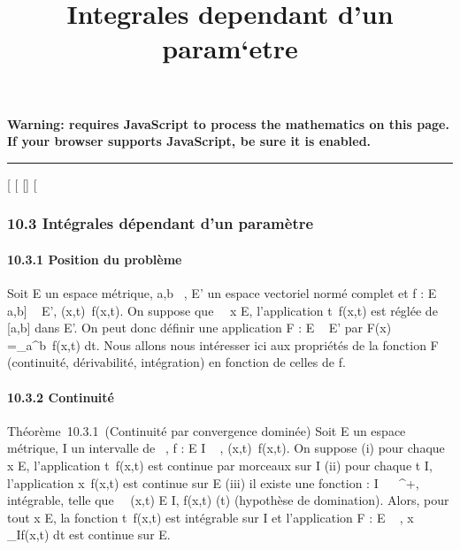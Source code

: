 \documentclass[]{article}
\title{Integrales dependant d'un param`etre}
\author{}
\date{}
\begin{document}
\maketitle

\textbf{Warning: 
requires JavaScript to process the mathematics on this page.\\ If your
browser supports JavaScript, be sure it is enabled.}

\begin{center}\rule{3in}{0.4pt}\end{center}

{[}
{[}
{[}{]}
{[}

\subsubsection{10.3 Intégrales dépendant d'un paramètre}

\paragraph{10.3.1 Position du problème}

Soit E un espace métrique, a,b \in {}~, E' un espace vectoriel normé complet
et f : E \times {[}a,b{]} \rightarrow~ E', (x,t)\mapsto~f(x,t). On
suppose que \forall~~x \in E, l'application
t\mapsto~f(x,t) est réglée de {[}a,b{]} dans E'. On
peut donc définir une application F : E \rightarrow~ E' par F(x)
=\int  _a^b~f(x,t) dt. Nous allons
nous intéresser ici aux propriétés de la fonction F (continuité,
dérivabilité, intégration) en fonction de celles de f.

\paragraph{10.3.2 Continuité}

Théorème~10.3.1~(Continuité par convergence dominée) Soit E un espace
métrique, I un intervalle de ~, f : E \times I \rightarrow~ ,
(x,t)\mapsto~f(x,t). On suppose (i) pour chaque x \in
E, l'application t\mapsto~f(x,t) est continue par
morceaux sur I (ii) pour chaque t \in I, l'application
x\mapsto~f(x,t) est continue sur E (iii) il existe
une fonction \phi : I \rightarrow~ ~^+, intégrable, telle que
\forall~~(x,t) \in E \times I, f(x,t)\leq
\phi(t) (hypothèse de domination). Alors, pour tout x \in E, la fonction
t\mapsto~f(x,t) est intégrable sur I et
l'application F : E \rightarrow~ ,
x\mapsto~\int ~
_If(x,t) dt est continue sur E.
\end{document}
